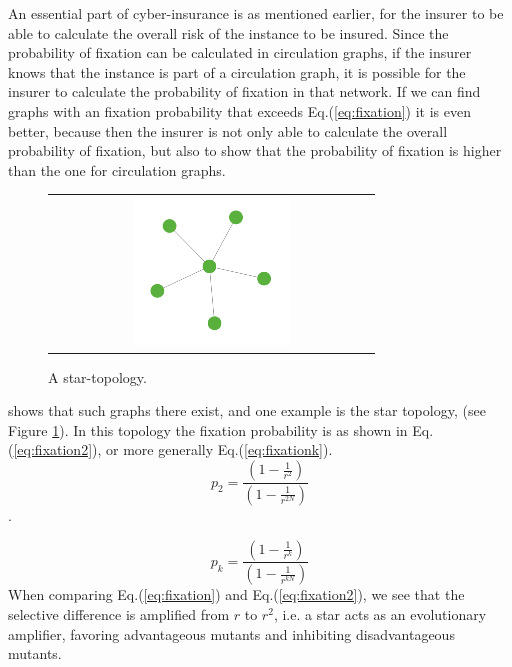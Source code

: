 An essential part of cyber-insurance is as mentioned earlier, for the insurer to be able to calculate the overall risk of the instance to be insured. Since the probability of fixation can be calculated in circulation graphs, if the insurer knows that the instance is part of a circulation graph, it is possible for the insurer to calculate the probability of fixation in that network. 
If we can find graphs with an fixation probability that exceeds Eq.(\ref{eq:fixation}) it is even better, because then the insurer is not only able to calculate the overall probability of fixation, but also to show that the probability of fixation is higher than the one for circulation graphs.
\begin{figure}[b]
\centering
\begin{tabular}{@{}c@{}}
\includegraphics[width=0.5\textwidth]{../Figures/aStar.png}
\end{tabular}
\caption{
\label{fig:star} A star-topology. 
}
\end{figure}
\cite{lieberman2005evolutionary} shows that such graphs there exist, and one example is the star topology, (see Figure \ref{fig:star}).
In this topology the fixation probability is as shown in Eq.(\ref{eq:fixation2}), or more generally Eq.(\ref{eq:fixationk}). \begin{equation}p_{2}=\frac{(1-\frac{1}{r^{2}})}{(1-\frac{1}{r^{2N}})} \label{eq:fixation2} \end{equation}.

\begin{equation}
p_{k}=\frac{(1-\frac{1}{r^{k}})}{(1-\frac{1}{r^{kN}})} \label{eq:fixationk}
\end{equation}
 When comparing Eq.(\ref{eq:fixation}) and Eq.(\ref{eq:fixation2}), we see that the selective difference is
 amplified from $r$ to $r^{2}$, i.e. a star acts as an evolutionary amplifier, favoring advantageous
  mutants and inhibiting disadvantageous mutants.

